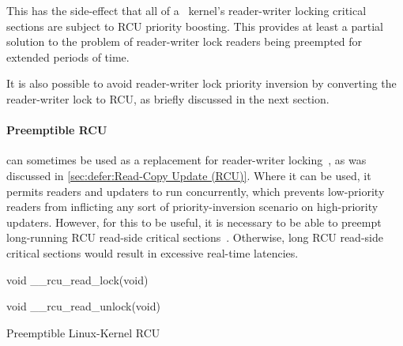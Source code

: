 This has the side-effect that all of a \rt\ kernel's reader-writer locking
critical sections are subject to RCU priority boosting.
This provides at least a partial solution to the problem of reader-writer
lock readers being preempted for extended periods of time.

It is also possible to avoid reader-writer lock priority inversion by
converting the reader-writer lock to RCU, as briefly discussed in the
next section.

\paragraph{Preemptible RCU}
can sometimes be used as a replacement for reader-writer
locking~\cite{PaulEMcKenney2007WhatIsRCUFundamentally,PaulMcKenney2012RCUUsage,PaulEMcKenney2014RCUAPI},
as was discussed in \cref{sec:defer:Read-Copy Update (RCU)}.
Where it can be used, it permits readers and updaters to run concurrently,
which prevents low-priority readers from inflicting any sort of
priority-inversion scenario on high-priority updaters.
However, for this to be useful, it is necessary to be able to preempt
long-running RCU read-side critical
sections~\cite{DinakarGuniguntala2008IBMSysJ}.
Otherwise, long RCU read-side critical sections would result in
excessive real-time latencies.

\begin{listing}
\begin{fcvlabel}
\begin{VerbatimL}[commandchars=\\\[\]]
void __rcu_read_lock(void)									\lnlbl[lock:e]

void __rcu_read_unlock(void)		        						\lnlbl[unl:e]
\end{VerbatimL}
\end{fcvlabel}
\caption{Preemptible Linux-Kernel RCU}
\label{lst:advsync:Preemptible Linux-Kernel RCU}
\end{listing}


